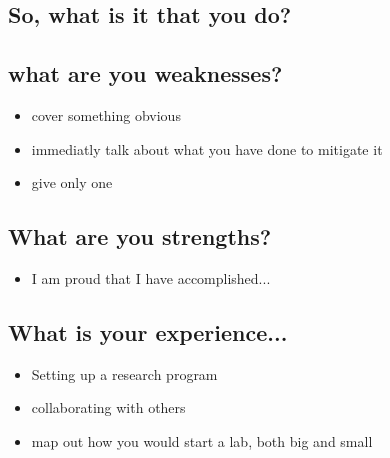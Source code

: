\documentclass[12pt]{article}
\begin{document}
\subsection{So, what is it that you do?}
\subsection{what are you weaknesses?}
\begin{itemize}
\item cover something obvious
\item immediatly talk about what you have done to mitigate it
\item give only one
\end{itemize}

\subsection{What are you strengths?}
\begin{itemize}
\item I am proud that I have accomplished...
\end{itemize}

\subsection{What is your experience...}
\begin{itemize}
\item Setting up a research program
\item collaborating with others
\item map out how you would start a lab, both big and small
\end{itemize}
\end{document}
